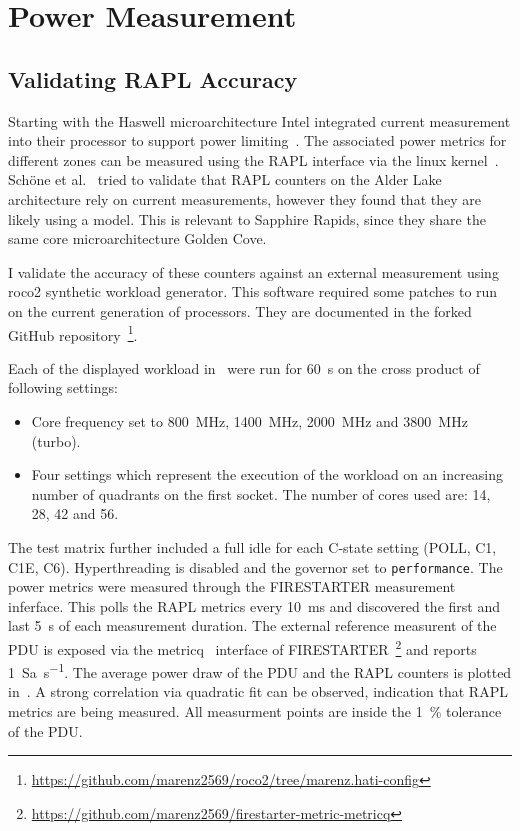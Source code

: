 \chapter{Power Measurement}

\section{Validating RAPL Accuracy}
Starting with the Haswell microarchitecture Intel integrated current measurement into their processor to support power limiting~\cite{Hackenberg_2015_Haswell}.
The associated power metrics for different zones can be measured using the RAPL interface via the linux kernel~\cite{powercap_kernel_doc}.
Schöne et al.~\cite{Schoene_2024_Alder_Lake} tried to validate that RAPL counters on the Alder Lake architecture rely on current measurements, however they found that they are likely using a model.
This is relevant to Sapphire Rapids, since they share the same core microarchitecture Golden Cove.

I validate the accuracy of these counters against an external measurement using roco2 synthetic workload generator.
This software required some patches to run on the current generation of processors.
They are documented in the forked GitHub repository~\footnote{\url{https://github.com/marenz2569/roco2/tree/marenz.hati-config}}.

Each of the displayed workload in~ were run for \SI{60}{\second} on the cross product of following settings:
\begin{itemize}
    \item Core frequency set to \SI{800}{\MHz}, \SI{1400}{\MHz}, \SI{2000}{\MHz} and \SI{3800}{\MHz} (turbo).
    \item Four settings which represent the execution of the workload on an increasing number of quadrants on the first socket.
    The number of cores used are: \SI{14}{}, \SI{28}{}, \SI{42}{} and \SI{56}{}.
\end{itemize}
The test matrix further included a full idle for each C-state setting (POLL, C1, C1E, C6).
Hyperthreading is disabled and the governor set to \texttt{performance}.
The power metrics were measured through the FIRESTARTER measurement inferface.
This polls the RAPL metrics every \SI{10}{\ms} and discovered the first and last \SI{5}{\second} of each measurement duration.
The external reference measurent of the PDU is exposed via the metricq~\cite{Ilsche_2019_MetricQ} interface of FIRESTARTER~\footnote{\url{https://github.com/marenz2569/firestarter-metric-metricq}} and reports \SI{1}{Sa\per\second}.
The average power draw of the PDU and the RAPL counters is plotted in~.
A strong correlation via quadratic fit can be observed, indication that RAPL metrics are being measured.
All measurment points are inside the \SI{1}{\percent} tolerance of the PDU.


